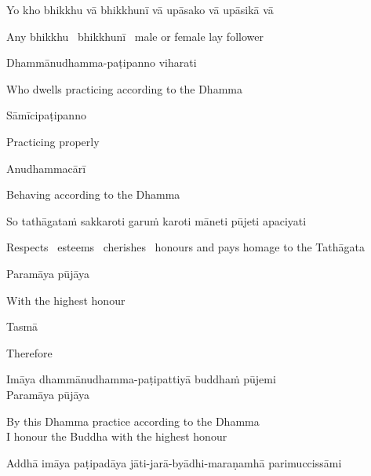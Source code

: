 Yo kho bhikkhu vā bhikkhunī vā upāsako vā upāsikā vā

\begin{english}
  Any bhikkhu \breathmark\ bhikkhunī \breathmark\ male or female lay follower
\end{english}

Dhammānudhamma-paṭipanno viharati

\begin{english}
  Who dwells practicing according to the Dhamma
\end{english}

Sāmīcipaṭipanno

\begin{english}
  Practicing properly
\end{english}

Anudhammacārī

\begin{english}
  Behaving according to the Dhamma
\end{english}

So tathāgataṁ sakkaroti garuṁ karoti māneti pūjeti apaciyati

\begin{english-hang}
  Respects \breathmark\ esteems \breathmark\ cherishes \breathmark\ honours and pays homage to the Tathāgata
\end{english-hang}

Paramāya pūjāya

\begin{english}
  With the highest honour
\end{english}

\suttaRef{[DN 16]}

Tasmā

\begin{english}
  Therefore
\end{english}

Imāya dhammānudhamma-paṭipattiyā buddhaṁ pūjemi\\
Paramāya pūjāya

\begin{english}
  By this Dhamma practice according to the Dhamma\\
  I honour the Buddha with the highest honour
\end{english}

\begin{pali-hang}
  Addhā imāya paṭipadāya jāti-jarā-byādhi-maraṇamhā parimuccissāmi
\end{pali-hang}

